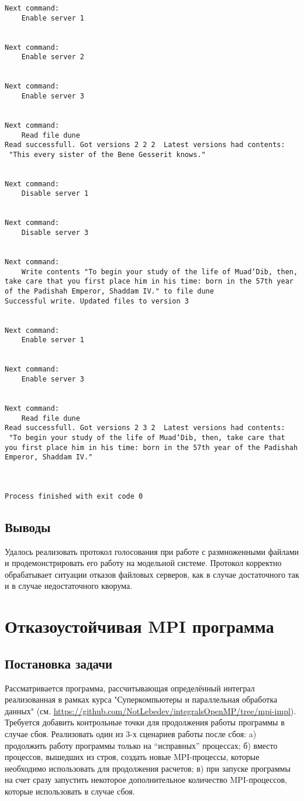\documentclass[a4paper,12pt,titlepage,finall]{article}
\begin{document}
\begin{lstlisting}
Next command:
	Enable server 1


Next command:
	Enable server 2


Next command:
	Enable server 3


Next command:
	Read file dune
Read successfull. Got versions 2 2 2  Latest versions had contents:
 "This every sister of the Bene Gesserit knows."


Next command:
	Disable server 1


Next command:
	Disable server 3


Next command:
	Write contents "To begin your study of the life of Muad‘Dib, then, take care that you first place him in his time: born in the 57th year of the Padishah Emperor, Shaddam IV." to file dune
Successful write. Updated files to version 3


Next command:
	Enable server 1


Next command:
	Enable server 3


Next command:
	Read file dune
Read successfull. Got versions 2 3 2  Latest versions had contents:
 "To begin your study of the life of Muad‘Dib, then, take care that you first place him in his time: born in the 57th year of the Padishah Emperor, Shaddam IV."



Process finished with exit code 0
\end{lstlisting}
\subsection{Выводы}
Удалось реализовать протокол голосования при работе с размноженными файлами и продемонстрировать его работу на модельной системе. Протокол корректно обрабатывает ситуации отказов файловых серверов, как в случае достаточного так и в случае недостаточного кворума.

\newpage
\section{Отказоустойчивая MPI программа}
\subsection{Постановка задачи}
Рассматривается программа, рассчитывающая определённый интеграл реализованная в рамках курса "Суперкомпьютеры и параллельная обработка данных" (см. \url{https://github.com/NotLebedev/integralsOpenMP/tree/mpi-impl}). Требуется добавить контрольные точки для продолжения работы программы в случае сбоя. Реализовать один из 3-х сценариев работы после сбоя: a) продолжить работу программы только на “исправных” процессах; б) вместо процессов, вышедших из строя, создать новые MPI-процессы, которые необходимо использовать для продолжения расчетов; в) при запуске программы на счет сразу запустить некоторое дополнительное количество MPI-процессов, которые использовать в случае сбоя.
\end{document}
